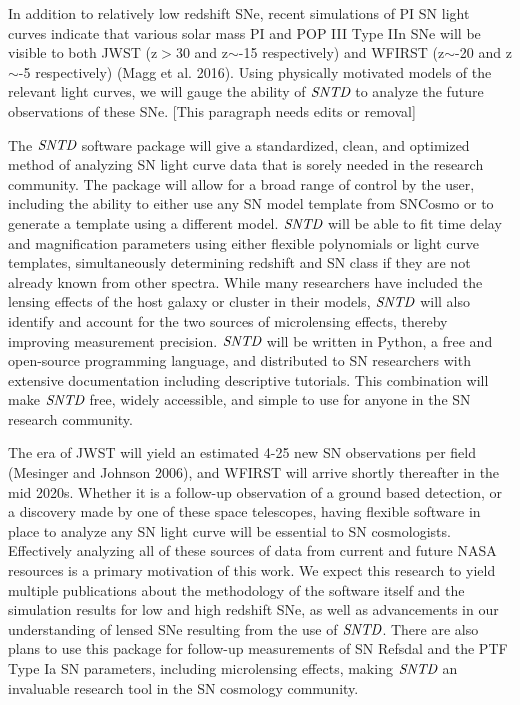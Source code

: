 In addition to relatively low redshift SNe, recent simulations of PI SN light curves indicate that various solar mass PI and POP III Type IIn SNe will be visible to both JWST (z$>$30 and z$\sim$-15 respectively) and WFIRST (z$\sim$-20 and z$\sim$-5 respectively) (Magg et al. 2016). Using physically motivated models of the relevant light curves, we will gauge the ability of $\textit{SNTD}$ to analyze the future observations of these SNe. [This paragraph needs edits or removal]


The $\textit{SNTD}$ software package will give a standardized, clean, and optimized method of analyzing SN light curve data that is sorely needed in the research community. The package will allow for a broad range of control by the user, including the ability to either use any SN model template from SNCosmo or to generate a template using a different model. $\textit{SNTD}$ will be able to fit time delay and magnification parameters using either flexible polynomials or light curve templates, simultaneously determining redshift and SN class if they are not already known from other spectra. While many researchers have included the lensing effects of the host galaxy or cluster in their models, $\textit{SNTD}$ will also identify and account for the two sources of microlensing effects, thereby improving measurement precision. $\textit{SNTD}$ will be written in Python, a free and open-source programming language, and distributed to SN researchers with extensive documentation including descriptive tutorials. This combination will make $\textit{SNTD}$ free, widely accessible, and simple to use for anyone in the SN research community.		

The era of JWST will yield an estimated 4-25 new SN observations per field (Mesinger and Johnson 2006), and WFIRST will arrive shortly thereafter in the mid 2020s. Whether it is a follow-up observation of a ground based detection, or a discovery made by one of these space telescopes, having flexible software in place to analyze any SN light curve will be essential to SN cosmologists. Effectively analyzing all of these sources of data from current and future NASA resources is a primary motivation of this work. We expect this research to yield multiple publications about the methodology of the software itself and the simulation results for low and high redshift SNe, as well as advancements in our understanding of lensed SNe resulting from the use of $\textit{SNTD}$. There are also plans to use this package for follow-up measurements of SN Refsdal and the PTF Type Ia SN parameters, including microlensing effects, making $\textit{SNTD}$ an invaluable research tool in the SN cosmology community. 

